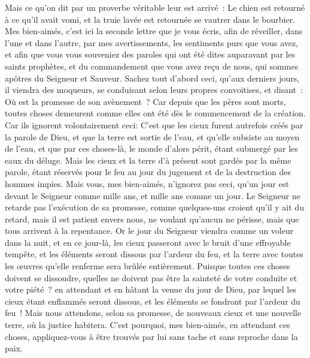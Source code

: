 \begin{multicols}{2}
Mais ce qu'on dit par un proverbe véritable leur est arrivé~: Le chien est retourné à ce qu'il avait vomi, et la truie lavée est retournée se vautrer dans le bourbier.
\VerseOne{}Mes bien-aimés, c'est ici la seconde lettre que je vous écris, afin de réveiller, dans l'une et dans l'autre, par mes avertissements, les sentiments purs que vous avez,
et afin que vous vous souveniez des paroles qui ont été dites auparavant par les saints prophètes, et du commandement que vous avez reçu de nous, qui sommes apôtres du Seigneur et Sauveur.
Sachez tout d'abord ceci, qu'aux derniers jours, il viendra des moqueurs, se conduisant selon leurs propres convoitises,
et disant~: Où est la promesse de son avènement~? Car depuis que les pères sont morts, toutes choses demeurent comme elles ont été dès le commencement de la création.
Car ils ignorent volontairement ceci: C'est que les cieux furent autrefois créés par la parole de Dieu, et que la terre est sortie de l'eau, et qu'elle subsiste au moyen de l'eau,
et que par ces choses-là, le monde d'alors périt, étant submergé par les eaux du déluge.
Mais les cieux et la terre d'à présent sont gardés par la même parole, étant réservés pour le feu au jour du jugement et de la destruction des hommes impies.
Mais vous, mes bien-aimés, n'ignorez pas ceci, qu'un jour est devant le Seigneur comme mille ans, et mille ans comme un jour.
Le Seigneur ne retarde pas l'exécution de sa promesse, comme quelques-uns croient qu'il y ait du retard, mais il est patient envers nous, ne voulant qu'aucun ne périsse, mais que tous arrivent à la repentance.
Or le jour du Seigneur viendra comme un voleur dans la nuit, et en ce jour-là, les cieux passeront avec le bruit d'une effroyable tempête, et les éléments seront dissous par l'ardeur du feu, et la terre avec toutes les œuvres qu'elle renferme sera brûlée entièrement.
Puisque toutes ces choses doivent se dissoudre, quelles ne doivent pas être la sainteté de votre conduite et votre piété~?
en attendant et en hâtant la venue du jour de Dieu, par lequel les cieux étant enflammés seront dissous, et les éléments se fondront par l'ardeur du feu~!
Mais nous attendons, selon sa promesse, de nouveaux cieux et une nouvelle terre, où la justice habitera.
C'est pourquoi, mes bien-aimés, en attendant ces choses, appliquez-vous à être trouvés par lui sans tache et sans reproche dans la paix.

\end{multicols}

